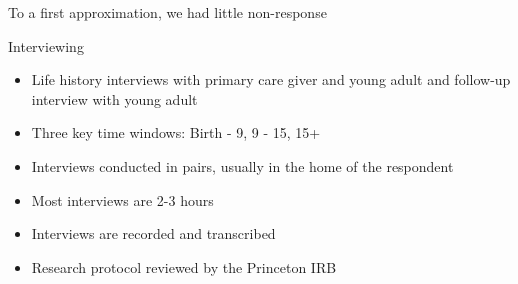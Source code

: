 \documentclass[aspectratio=169]{beamer}
\begin{document}
\begin{frame}
\begin{center}
\end{center}

\end{frame}
\begin{frame}

To a first approximation, we had little non-response

\end{frame}
\begin{frame}

\begin{center}
{\Large Interviewing}
\end{center}

\end{frame}
\begin{frame}

\begin{itemize}
\item Life history interviews with primary care giver and young adult and follow-up interview with young adult
\pause
\item Three key time windows: Birth - 9, 9 - 15, 15+
\pause
\item Interviews conducted in pairs, usually in the home of the respondent
\pause
\item Most interviews are 2-3 hours
\pause
\item Interviews are recorded and transcribed
\pause
\item Research protocol reviewed by the Princeton IRB
\end{itemize}

\end{frame}
\end{document}
